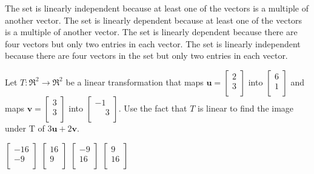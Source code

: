 \documentclass[11pt]{exam}
\begin{document}
\begin{questions}
\begin{choices}
\choice The set is linearly independent because at least one of the vectors is a multiple of another vector.
\choice The set is linearly dependent because at least one of the vectors is a multiple of another vector.
\choice The set is linearly dependent because there are four vectors but only two entries in each vector. %
\choice The set is linearly independent because there are four vectors in the set but only two entries in each vector.
\end{choices}
\answerline

  \addpoints
  \question[2]
Let $T: \Re^{2}\rightarrow \Re^{2}$ be a linear transformation that maps $\mathbf{u}=\left[\begin{array}{c} 2 \\ 3 \\ \end{array}\right]$ into $\left[\begin{array}{c} 6 \\ 1 \\ \end{array}\right]$ and maps $\mathbf{v}=\left[\begin{array}{c} 3 \\ 3 \\ \end{array}\right]$ into $\left[\begin{array}{c} -1 \\ \phantom{-}3 \\ \end{array}\right]$. Use the fact that $T$ is linear to find the image under T of $3\mathbf{u}+2\mathbf{v}$. 

\begin{oneparchoices}
\choice $\left[\begin{array}{c} -16 \\ -9 \\ \end{array}\right]$
\choice $\left[\begin{array}{c} 16 \\ 9 \\ \end{array}\right]$ %
\choice $\left[\begin{array}{c} -9 \\ 16 \\ \end{array}\right]$
\choice $\left[\begin{array}{c} 9 \\ 16 \\ \end{array}\right]$
\end{oneparchoices}
\answerline


\end{questions}
\end{document}
